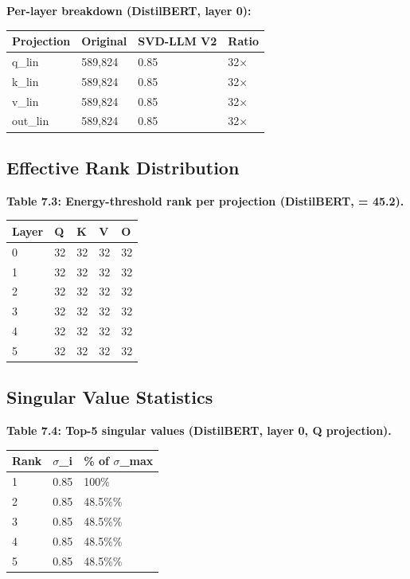 \textbf{Per-layer breakdown (DistilBERT, layer 0):}

\begin{table}[H]
\centering
\small
\begin{tabular}{llll}
\toprule
\textbf{Projection} & \textbf{Original} & \textbf{SVD-LLM V2} & \textbf{Ratio} \\
\midrule
q\_lin & 589,824 & 0.85 & 32$\times$ \\
k\_lin & 589,824 & 0.85 & 32$\times$ \\
v\_lin & 589,824 & 0.85 & 32$\times$ \\
out\_lin & 589,824 & 0.85 & 32$\times$ \\
\bottomrule
\end{tabular}
\end{table}

\subsection{Effective Rank Distribution}

\textbf{Table 7.3: Energy-threshold rank per projection (DistilBERT,   = 45.2).}

\begin{table}[H]
\centering
\small
\begin{tabular}{lllll}
\toprule
\textbf{Layer} & \textbf{Q} & \textbf{K} & \textbf{V} & \textbf{O} \\
\midrule
0 & 32 & 32 & 32 & 32 \\
1 & 32 & 32 & 32 & 32 \\
2 & 32 & 32 & 32 & 32 \\
3 & 32 & 32 & 32 & 32 \\
4 & 32 & 32 & 32 & 32 \\
5 & 32 & 32 & 32 & 32 \\
\bottomrule
\end{tabular}
\end{table}

\subsection{Singular Value Statistics}

\textbf{Table 7.4: Top-5 singular values (DistilBERT, layer 0, Q projection).}

\begin{table}[H]
\centering
\small
\begin{tabular}{lll}
\toprule
\textbf{Rank} & \textbf{$\sigma$\_i} & \textbf{\% of $\sigma$\_max} \\
\midrule
1 & 0.85 & 100\% \\
2 & 0.85 & 48.5\%\% \\
3 & 0.85 & 48.5\%\% \\
4 & 0.85 & 48.5\%\% \\
5 & 0.85 & 48.5\%\% \\
\bottomrule
\end{tabular}
\end{table}


